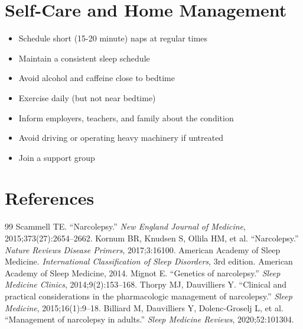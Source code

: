 \section*{Self-Care and Home Management}
\begin{itemize}
\item Schedule short (15-20 minute) naps at regular times
\item Maintain a consistent sleep schedule
\item Avoid alcohol and caffeine close to bedtime
\item Exercise daily (but not near bedtime)
\item Inform employers, teachers, and family about the condition
\item Avoid driving or operating heavy machinery if untreated
\item Join a support group
\end{itemize}

\section*{References}
\begin{thebibliography}{99}
 Scammell TE. ``Narcolepsy.'' \textit{New England Journal of Medicine}, 2015;373(27):2654--2662.
 Kornum BR, Knudsen S, Ollila HM, et al. ``Narcolepsy.'' \textit{Nature Reviews Disease Primers}, 2017;3:16100.
 American Academy of Sleep Medicine. \textit{International Classification of Sleep Disorders}, 3rd edition. American Academy of Sleep Medicine, 2014.
 Mignot E. ``Genetics of narcolepsy.'' \textit{Sleep Medicine Clinics}, 2014;9(2):153--168.
 Thorpy MJ, Dauvilliers Y. ``Clinical and practical considerations in the pharmacologic management of narcolepsy.'' \textit{Sleep Medicine}, 2015;16(1):9--18.
 Billiard M, Dauvilliers Y, Dolenc-Groselj L, et al. ``Management of narcolepsy in adults.'' \textit{Sleep Medicine Reviews}, 2020;52:101304.

\end{thebibliography}
